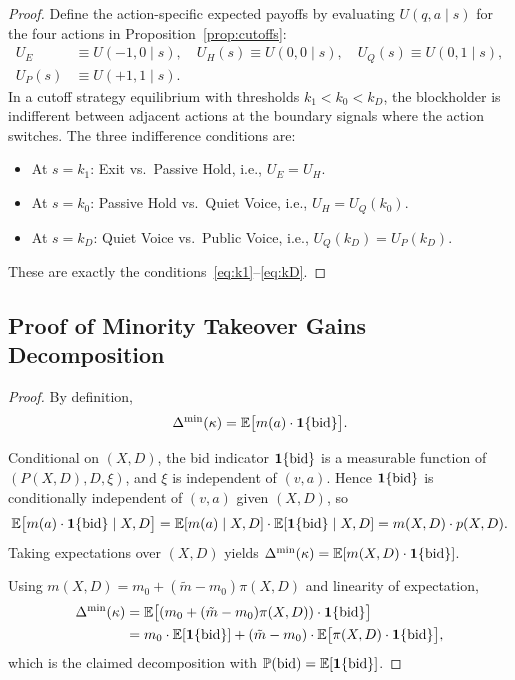 \documentclass[11pt]{article}
\newcommand{\E}{\mathbb{E}}
\newcommand{\PP}{\mathbb{P}}
\newcommand{\1}{\mathbf{1}}
\begin{document}
\begin{proof}
  Define the action-specific expected payoffs by evaluating $U(q,a \mid s)$ for the four actions in Proposition~\ref{prop:cutoffs}:
  \begin{align*}
  U_E &\equiv U(-1,0 \mid s), \quad U_H(s)\equiv U(0,0 \mid s), \quad U_Q(s)\equiv U(0,1 \mid s), \\
  U_P(s) &\equiv U(+1,1 \mid s).
  \end{align*}
In a cutoff strategy equilibrium with thresholds $k_1<k_0<k_D$, the blockholder is indifferent between adjacent actions at the boundary signals where the action switches. The three indifference conditions are:
\begin{itemize}[leftmargin=1.5em,itemsep=0pt]
\item At $s = k_1$: Exit vs.\ Passive Hold, i.e., $U_E = U_H$.
\item At $s = k_0$: Passive Hold vs.\ Quiet Voice, i.e., $U_H = U_Q(k_0)$.
\item At $s = k_D$: Quiet Voice vs.\ Public Voice, i.e., $U_Q(k_D) = U_P(k_D)$.
\end{itemize}
These are exactly the conditions~\eqref{eq:k1}--\eqref{eq:kD}.
\end{proof}

\subsection{Proof of Minority Takeover Gains Decomposition}
\label{app:proof-minority-decomp}

\begin{proof}
  By definition,
  \[
  \Delta^{\min}(\kappa)=\E\big[m(a)\cdot \1\{\textup{bid}\}\big].
  \]

    Conditional on $(X,D)$, the bid indicator $\1\{\textup{bid}\}$ is a measurable function of $(P(X,D),D,\xi)$, and $\xi$ is independent of $(v,a)$. Hence $\1\{\textup{bid}\}$ is conditionally independent of $(v,a)$ given $(X,D)$, so
    \[
    \E\big[m(a)\cdot \1\{\textup{bid}\} \mid X,D\big]
    =\E[m(a) \mid X,D]\cdot \E[\1\{\textup{bid}\} \mid X,D]
    =m(X,D)\cdot p(X,D).
    \]
  Taking expectations over $(X,D)$ yields $\Delta^{\min}(\kappa)=\E[m(X,D)\cdot \1\{\textup{bid}\}]$.

  Using $m(X,D)=m_0+(\tilde{m}-m_0)\pi(X,D)$ and linearity of expectation,
  \begin{align*}
  \Delta^{\min}(\kappa)
  &=\E\big[(m_0+(\tilde{m}-m_0)\pi(X,D))\cdot \1\{\textup{bid}\}\big] \\
  &=m_0\cdot \E[\1\{\textup{bid}\}] + (\tilde{m}-m_0)\cdot \E\big[\pi(X,D)\cdot \1\{\textup{bid}\}\big],
  \end{align*}
  which is the claimed decomposition with $\PP(\textup{bid})=\E[\1\{\textup{bid}\}]$.
\end{proof}
\end{document}
